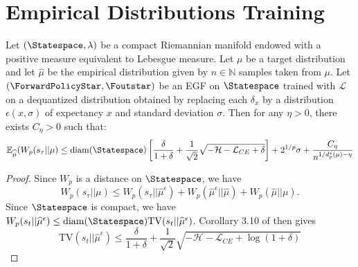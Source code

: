 \section{Empirical Distributions Training}








\begin{theorem} Let $(\Statespace,\lambda)$ be a compact Riemannian manifold endowed with a positive measure equivalent to Lebesgue measure.
Let $\mu$ be a target distribution and let $\widehat{\mu}$ be the empirical distribution given by $n\in \mathbb N$ samples taken from $\mu$. Let  $(\ForwardPolicyStar, \Foutstar)$ be an EGF on $\Statespace$ trained with $\mathcal L_{} $ on a dequantized distribution obtained by replacing each $\delta_x$ by a distribution $\epsilon(x,\sigma)$ of expectancy $x$ and standard deviation $\sigma$.
Then for any $\eta>0$, there exists $C_\eta>0$ such that:
\begin{equation}
    \mathbb E_{\widehat{\mu}}(W_p(s_\tau || \mu) \leq \mathrm{diam}(\Statespace)\left[\frac{\delta}{1+\delta} + \frac{1}{\sqrt{2}}\sqrt{-\mathcal H-\mathcal L_{CE}+\delta}\right] +2^{1/p}\sigma + \frac{C_\eta}{n^{1/d^*_p(\mu)-\eta}}
\end{equation}


\end{theorem}
\begin{proof}
    Since $W_p$ is a distance on $\Statespace$, we have
    \begin{equation}
        W_p(s_\tau|| \mu ) \leq W_p(s_\tau || \widehat{\mu}^\epsilon) + W_p(\widehat{\mu}^\epsilon|| \widehat{\mu} ) + W_p(\widehat{\mu}||\mu).
    \end{equation}
    Since $\Statespace$ is compact, we have $W_p(s_t||\widehat{\mu}^\epsilon)\leq \mathrm{diam}(\Statespace) \mathrm{TV}(s_t||\widehat{\mu}^\epsilon)$.
    Corollary 3.10 of \cite{brunswicEGF} then gives
    \begin{equation}
         \mathrm{TV}(s_t||\widehat{\mu}^\epsilon) \leq \frac{\delta}{1+\delta} +\frac{1}{\sqrt{2}} \sqrt{-\mathcal H - \mathcal L_{CE}+\log(1+\delta)}
    \end{equation}
\end{proof}


\cite{weed2019sharp}